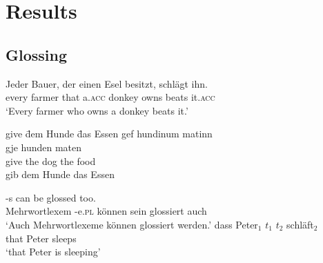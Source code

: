 \chapter{Results}
\label{c:result}

\section{Glossing}



\begin{exe}
\ex
\gll Jeder Bauer, der einen Esel besitzt, schlägt ihn. \\
every farmer that a.\textsc{acc} donkey owns beats it.\textsc{acc}\\ \glt `Every farmer who owns a donkey beats it.' \hfill \textcite{geach1962reference}
\label{ex1}
\end{exe}


\begin{singlespacing} %
\begin{exe}
    \ex \begin{tabbing}
      give \= dem Hunde \= das Essen \kill
      gef \> hundinum \> matinn \\
      gje \> hunden \> maten\\
      give \> the dog \> the food \\
      gib \> dem Hunde \> das Essen
    \end{tabbing}
    \label{ex2}
\end{exe}
\end{singlespacing}


\begin{exe} \ex
{} -s can be glossed too.\\ Mehrwortlexem -e.\textsc{pl} können sein glossiert auch\\ \glt `Auch Mehrwortlexeme können glossiert werden.'
\ex
\gll dass Peter$_{1}$ $t_{1}$ $t_{2}$ schläft$_{2}$\\ that Peter {} {} sleeps\\
\glt `that Peter is sleeping'
\end{exe}

